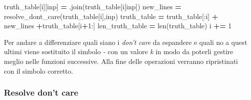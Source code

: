 \documentclass[
  italian,
]{book}
\newenvironment{Shaded}{\begin{snugshade}}{\end{snugshade}}
\newcommand{\BuiltInTok}[1]{#1}
\newcommand{\DecValTok}[1]{\textcolor[rgb]{0.00,0.00,0.81}{#1}}
\newcommand{\NormalTok}[1]{#1}
\newcommand{\OperatorTok}[1]{\textcolor[rgb]{0.81,0.36,0.00}{\textbf{#1}}}
\newcommand{\StringTok}[1]{\textcolor[rgb]{0.31,0.60,0.02}{#1}}
\begin{document}
\begin{Shaded}
\begin{Highlighting}[]
\NormalTok{        truth\_table[i][}\StringTok{\textquotesingle{}inp\textquotesingle{}}\NormalTok{] }\OperatorTok{=} \StringTok{\textquotesingle{}\textquotesingle{}}\NormalTok{.join(truth\_table[i[}\StringTok{\textquotesingle{}inp\textquotesingle{}}\NormalTok{])}
\NormalTok{        new\_lines }\OperatorTok{=}\NormalTok{ resolve\_dont\_care(truth\_table[i],}\StringTok{\textquotesingle{}inp\textquotesingle{}}\NormalTok{)}
\NormalTok{        truth\_table }\OperatorTok{=}\NormalTok{ truth\_table[:i] }\OperatorTok{+}\NormalTok{ new\_lines }\OperatorTok{+}\NormalTok{truth\_table[i}\OperatorTok{+}\DecValTok{1}\NormalTok{:]}
\NormalTok{        len\_truth\_table }\OperatorTok{=} \BuiltInTok{len}\NormalTok{(truth\_table)}
\NormalTok{    i }\OperatorTok{+=} \DecValTok{1}
\end{Highlighting}
\end{Shaded}

Per andare a differenziare quali siano i \emph{don't care} da espandere e quali no a quest ultimi viene sostituito il simbolo \emph{-} con un valore \emph{k} in modo da poterli gestire meglio nelle funzioni successive. Alla fine delle operazioni verranno ripristinati con il simbolo corretto.

\newpage

\hypertarget{resolve-dont-care}{%
\subsubsection{Resolve don't care}\label{resolve-dont-care}}
\end{document}
